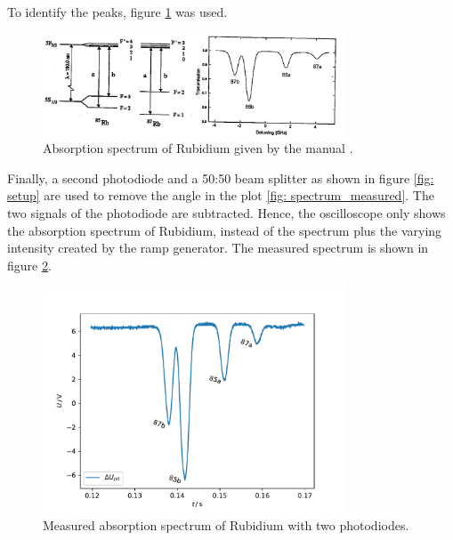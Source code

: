 To identify the peaks, figure \ref{fig: spectrum_manual} was used.
\begin{figure}
  \centering
  \includegraphics[width = 0.8\textwidth]{./content/images/absorption_spectrum_rubidium.png}
  \caption{Absorption spectrum of Rubidium given by the manual \cite{anleitung60}.}
  \label{fig: spectrum_manual}
\end{figure}
Finally, a second photodiode and a 50:50 beam splitter as shown in figure \ref{fig: setup}
are used to remove the angle in the plot \ref{fig: spectrum_measured}. The two signals of
the photodiode are subtracted. Hence, the oscilloscope only shows the
absorption spectrum of Rubidium, instead of the spectrum plus the varying intensity created by the
ramp generator. The measured spectrum is shown in figure \ref{fig: spectrum_measured_straight}.
\begin{figure}
  \centering
  \includegraphics[width = 0.8\textwidth]{../analysis/plots/spectrum_straight.pdf}
  \caption{Measured absorption spectrum of Rubidium with two photodiodes.}
  \label{fig: spectrum_measured_straight}
\end{figure}
